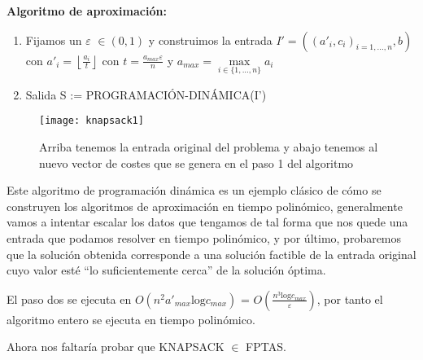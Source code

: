 \documentclass[a4paper,12pt,titlepage]{article}
\begin{document}
\vspace{0.3cm}

\textbf{Algoritmo de aproximaci\'on:}\cite{knapsack2}
\begin{enumerate}
\item Fijamos un $\varepsilon$ $\in (0,1)$ y construimos la entrada $I' = ((a'_i,c_i)_{i=1,...,n},b)$ con $a'_i = \left\lfloor \frac{a_{i}}{t}\right\rfloor$ con $t=\frac{a_{max}\varepsilon}{n}$ y $a_{max} = \max\limits_{i\in\{1,...,n\}}a_i$
\item Salida S := PROGRAMACI\'ON-DIN\'AMICA(I')
\end{enumerate}

\begin{figure}[h]
\centering
\texttt{[image: knapsack1]}
\caption{Arriba tenemos la entrada original del problema y abajo tenemos al nuevo vector de costes que se genera en el paso 1 del algoritmo}
\end{figure}

Este algoritmo de programaci\'on din\'amica es un ejemplo cl\'asico de c\'omo se construyen los algoritmos de aproximaci\'on en tiempo polin\'omico, generalmente vamos a intentar escalar los datos que tengamos de tal forma que nos quede una entrada que podamos resolver en tiempo polin\'omico, y por \'ultimo, probaremos que la soluci\'on obtenida corresponde a una soluci\'on factible de la entrada original cuyo valor est\'e ``lo suficientemente cerca'' de la soluci\'on \'optima.

El paso dos se ejecuta en $O(n^{2}a'_{max}\text{log}c_{max})$ = $O(\frac{n^{3}\text{log}c_{max}}{\varepsilon})$, por tanto el algoritmo entero se ejecuta en tiempo polin\'omico.

Ahora nos faltar\'ia probar que KNAPSACK $\in$ FPTAS.
\end{document}
